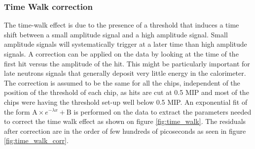 \subsubsection{Time Walk correction}
\label{subsec:timewalk}

The time-walk effect is due to the presence of a threshold that induces a time shift between a small amplitude signal and a high amplitude signal. Small amplitude signals will systematically trigger at a later time than high amplitude signals. A correction can be applied on the data by looking at the time of the first hit versus the amplitude of the hit. This might be particularly important for late neutrons signals that generally deposit very little energy in the calorimeter. The correction is assumed to be the same for all the chips, independent of the position of the threshold of each chip, as hits are cut at 0.5 MIP and most of the chips were having the threshold set-up well below 0.5 MIP. An exponential fit of the form $\text{A} \times e^{-\lambda{}x} + \text{B}$ is performed on the data to extract the parameters needed to correct the time walk effect as shown on figure \ref{fig:time_walk}. The residuals after correction are in the order of few hundreds of picoseconds as seen in figure \ref{fig:time_walk_corr}.

